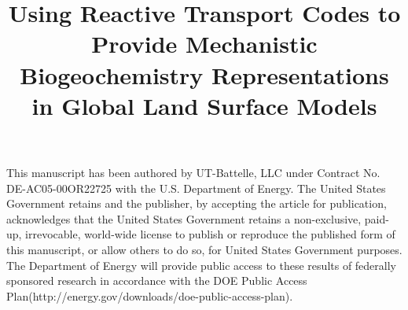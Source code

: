 \documentclass[gmd, manuscript]{copernicus}
\begin{document}
\linenumbers

\title{Using Reactive Transport Codes to Provide Mechanistic Biogeochemistry Representations in Global Land Surface Models}







\received{}
\pubdiscuss{} %
\revised{}
\accepted{}
\published{}



\maketitle

This manuscript has been authored by UT-Battelle, LLC under Contract No. DE-AC05-00OR22725 with the U.S. Department of Energy.  The United States
Government retains and the publisher, by accepting the article for publication, acknowledges that the United States Government retains a non-exclusive,
paid-up, irrevocable, world-wide license to publish or reproduce the published form of this manuscript, or allow others to do so, for United States Government
purposes.  The Department of Energy will provide public access to these results of federally sponsored research in accordance with the DOE Public Access
Plan(http://energy.gov/downloads/doe-public-access-plan).
\end{document}

